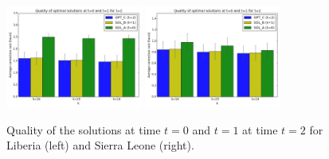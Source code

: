 

\begin{figure}
    \centering
       \includegraphics[width=0.40\textwidth]{new_figs/plotABC_L.png}
       \includegraphics[width=0.40\textwidth]{new_figs/plotABC_SL.png}
    \caption{Quality of the solutions at time $t=0$ and $t=1$ at time $t=2$ for Liberia (left) and Sierra Leone (right). }
\label{fig:ABC_2countries}
\end{figure}

